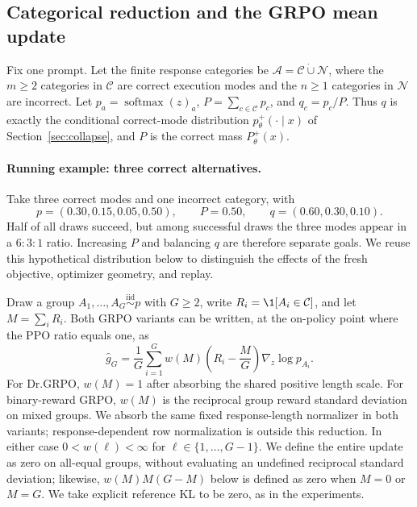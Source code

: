 \subsection{Categorical reduction and the GRPO mean update}
\label{app:theory-grpo-mean}

Fix one prompt. Let the finite response categories be
$\mathcal A=\mathcal C\mathbin{\dot\cup}\mathcal N$, where the $m\ge2$
categories in $\mathcal C$ are correct execution modes and the $n\ge1$
categories in $\mathcal N$ are incorrect. Let
$p_a=\operatorname{softmax}(z)_a$, $P=\sum_{c\in\mathcal C}p_c$, and
$q_c=p_c/P$. Thus $q$ is exactly the conditional correct-mode distribution
$p_\theta^+(\cdot\mid x)$ of Section~\ref{sec:collapse}, and $P$ is the correct
mass $P_\theta^+(x)$.

\paragraph{Running example: three correct alternatives.}
\label{ex:theory-running}
Take three correct modes and one incorrect category, with
\[
 p=(0.30,0.15,0.05,0.50),\qquad P=0.50,\qquad q=(0.60,0.30,0.10).
\]
Half of all draws succeed, but among successful draws the three modes appear
in a $6{:}3{:}1$ ratio. Increasing $P$ and balancing $q$ are therefore
separate goals. We reuse this hypothetical distribution below to distinguish
the effects of the fresh objective, optimizer geometry, and replay.

Draw a group $A_1,\ldots,A_G\stackrel{\mathrm{iid}}{\sim}p$ with $G\ge2$,
write $R_i=\1[A_i\in\mathcal C]$, and let $M=\sum_iR_i$. Both GRPO variants
can be written, at the on-policy point where the PPO ratio equals one, as
\begin{equation}
  \widehat g_G
  =\frac1G\sum_{i=1}^G
   w(M)\left(R_i-\frac{M}{G}\right)\nabla_z\log p_{A_i}.
  \label{eq:group-estimator}
\end{equation}
For Dr.GRPO, $w(M)=1$ after absorbing the shared positive length scale. For
binary-reward GRPO, $w(M)$ is the reciprocal group reward standard deviation
on mixed groups. We absorb the same fixed response-length normalizer in both
variants; response-dependent row normalization is outside this reduction.
In either case $0<w(\ell)<\infty$ for $\ell\in\{1,\ldots,G-1\}$.
We define the entire update as zero on all-equal groups, without evaluating an
undefined reciprocal standard deviation; likewise, $w(M)M(G-M)$ below is
defined as zero when $M=0$ or $M=G$. We take explicit reference KL to be zero, as
in the experiments.

